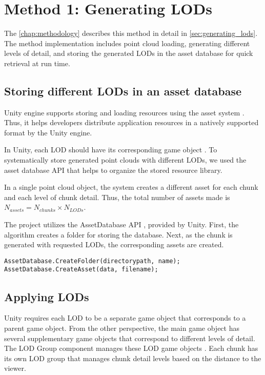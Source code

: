 \section{Method 1: Generating LODs}

The \autoref{chap:methodology} describes this method in detail in  \autoref{sec:generating_lods}. The method implementation includes point cloud loading, generating different levels of detail, and storing the generated LODs in the asset database for quick retrieval at run time.

\subsection{Storing different LODs in an asset database}

Unity engine supports storing and loading resources using the asset system \cite{UnityManAssetWorkflow}. Thus, it helps developers distribute application resources in a natively supported format by the Unity engine.

In Unity, each LOD should have its corresponding game object \cite{UnityManLod}. To systematically store generated point clouds with different LODs, we used the asset database API that helps to organize the stored resource library.

In a single point cloud object, the system creates a different asset for each chunk and each level of chunk detail. Thus, the total number of assets made is $N_{assets}=N_{chunks}\times N_{LODs}$.

The project utilizes the AssetDatabase API \cite{UnityManAssetDb}, provided by Unity. First, the algorithm creates a folder for storing the database. Next, as the chunk is generated with requested LODs, the corresponding assets are created.

\begin{lstlisting}[language={[Sharp]C}, caption=Asset database API usage example.]
AssetDatabase.CreateFolder(directorypath, name);
AssetDatabase.CreateAsset(data, filename);
\end{lstlisting}

\subsection{Applying LODs}

Unity requires each LOD to be a separate game object that corresponds to a parent game object. From the other perspective, the main game object has several supplementary game objects that correspond to different levels of detail. The LOD Group component manages these LOD game objects \cite{UnityManLodGroup}. Each chunk has its own LOD group that manages chunk detail levels based on the distance to the viewer.

